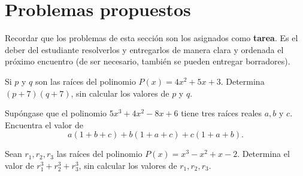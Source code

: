 \section{Problemas propuestos}
{
    Recordar que los problemas de esta sección son los asignados como \textbf{tarea}.
    Es el deber del estudiante resolverlos y entregarlos de manera clara y ordenada el próximo encuentro
     (de ser necesario, también se pueden entregar borradores).

    \begin{section-problem}
        Si $p$ y $q$ son las raíces del polinomio $P(x) = 4x^2 + 5x + 3$.
        Determina $(p + 7)(q + 7)$, sin calcular los valores de $p$ y $q$.
    \end{section-problem}

    \begin{section-problem}
        Supóngase que el polinomio $5x^3 + 4x^2 - 8x + 6$ tiene tres raíces reales $a, b \mbox{ y } c$.
        Encuentra el valor de \[a(1 + b + c) + b(1 + a + c) + c(1 + a + b).\]
    \end{section-problem}

    \begin{section-problem}
        Sean $r_1, r_2, r_3$ las raíces del polinomio $P(x) = x^3 - x^2 + x - 2$.
        Determina el valor de $r^3_1 + r^3_2 + r^3_3$, sin calcular los valores de $r_1, r_2, r_3$.
    \end{section-problem}
}
\label{sec:problemas-propuestos}